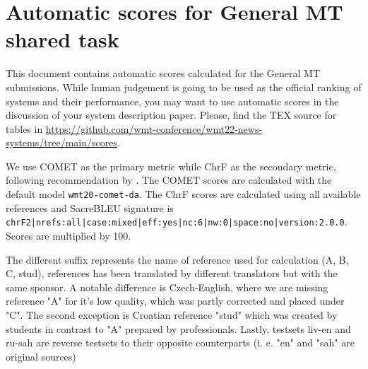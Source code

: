 \usepackage{colortbl}
\usepackage{booktabs}
\def\Const{\rowcolor{white}}
\def\UnCon{\rowcolor{lightgray}}

\section{Automatic scores for General MT shared task}

This document contains automatic scores calculated for the General MT submissions. While human judgement is going to be used as the official ranking of systems and their performance, you may want to use automatic scores in the discussion of your system description paper. Please, find the TEX source for tables in \url{https://github.com/wmt-conference/wmt22-news-systems/tree/main/scores}.

We use COMET \cite{rei-etal-2020-comet} as the primary metric while ChrF \cite{popovic-2015-chrf} as the secondary metric, following recommendation by \citep{kocmi-etal-2021-ship}.
The COMET scores are calculated with the default model \texttt{wmt20-comet-da}.
The ChrF scores are calculated using all available references and SacreBLEU signature \cite{post-2018-call} is \texttt{chrF2|nrefs:all|case:mixed|eff:yes|nc:6|nw:0|space:no|version:2.0.0}. 
Scores are multiplied by 100.

The different suffix represents the name of reference used for calculation (A, B, C, stud), references has been translated by different translators but with the same sponsor. A notable difference is Czech-English, where we are missing reference "A" for it's low quality, which was partly corrected and placed under "C". The second exception is Croatian reference "stud" which was created by students in contrast to "A" prepared by professionals. Lastly, testsets liv-en and ru-sah are reverse testsets to their opposite counterparts (i. e. "en" and "sah" are original sources)


